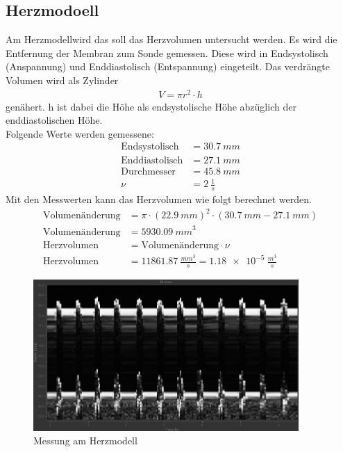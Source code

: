 \subsection{Herzmodoell}
Am Herzmodellwird das soll das Herzvolumen untersucht werden.
Es wird die Entfernung der Membran zum Sonde gemessen.
Diese wird in Endsystolisch (Anspannung) und Enddiastolisch (Entspannung) eingeteilt.
Das verdrängte Volumen wird als Zylinder
\begin{align*}
  V=\pi r^2 \cdot h
\end{align*}
genähert. h ist dabei die Höhe als endsystolische Höhe abzüglich der enddiastolischen Höhe.
\\Folgende Werte werden gemessene:
\begin{align*}
  \text{Endsystolisch}&=\SI{30,7}{mm}\\
  \text{Enddiastolisch}&=\SI{27,1}{mm}\\
  \text{Durchmesser}&=\SI{45,8}{mm}\\
  \nu&=\SI{2}{\frac{1}{s}}
\end{align*}
Mit den Messwerten kann das Herzvolumen wie folgt berechnet werden.
\begin{align*}
\text{Volumenänderung}&=\pi\cdot (\SI{22,9}{mm})^2\cdot(\SI{30,7}{mm}-\SI{27,1}{mm})\\
  \text{Volumenänderung}&=\SI{5930,09}{mm}^3\\
  \text{Herzvolumen} &= \text{Volumenänderung}\cdot \nu\\
  \text{Herzvolumen} &= \SI{11861,87}{\frac{mm^3}{s}}=\SI{1,18e-5}{\frac{m^3}{s}}
\end{align*}
\begin{figure}[h!]
  \centering
  \includegraphics[width=0.9\textwidth]{herz.png}
  \caption{Messung am Herzmodell \cite{1}}
  \label{fig:herz}
\end{figure}
